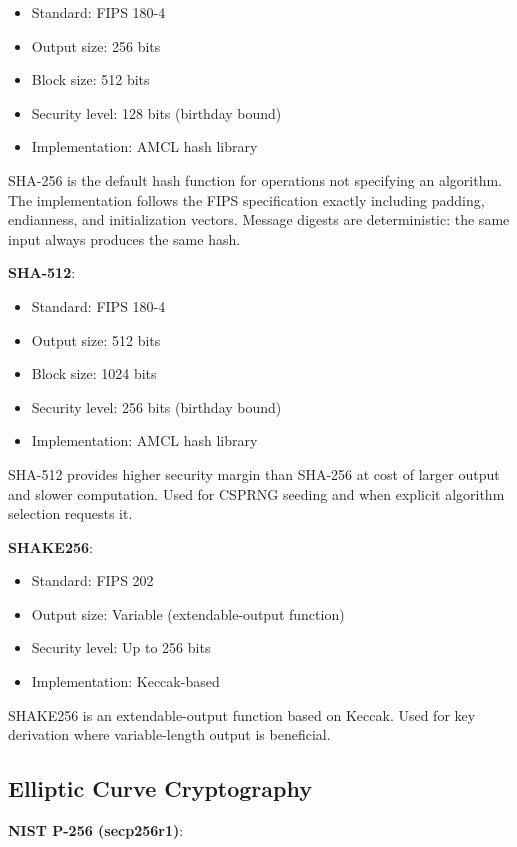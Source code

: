 \begin{itemize}
\item Standard: FIPS 180-4
\item Output size: 256 bits
\item Block size: 512 bits
\item Security level: 128 bits (birthday bound)
\item Implementation: AMCL hash library
\end{itemize}

SHA-256 is the default hash function for operations not specifying an
algorithm. The implementation follows the FIPS specification exactly
including padding, endianness, and initialization vectors. Message
digests are deterministic: the same input always produces the same
hash.

\textbf{SHA-512}:

\begin{itemize}
\item Standard: FIPS 180-4
\item Output size: 512 bits
\item Block size: 1024 bits
\item Security level: 256 bits (birthday bound)
\item Implementation: AMCL hash library
\end{itemize}

SHA-512 provides higher security margin than SHA-256 at cost of larger
output and slower computation. Used for CSPRNG seeding and when
explicit algorithm selection requests it.

\textbf{SHAKE256}:

\begin{itemize}
\item Standard: FIPS 202
\item Output size: Variable (extendable-output function)
\item Security level: Up to 256 bits
\item Implementation: Keccak-based
\end{itemize}

SHAKE256 is an extendable-output function based on Keccak. Used for
key derivation where variable-length output is beneficial.

\subsection{Elliptic Curve Cryptography}

\textbf{NIST P-256 (secp256r1)}:

